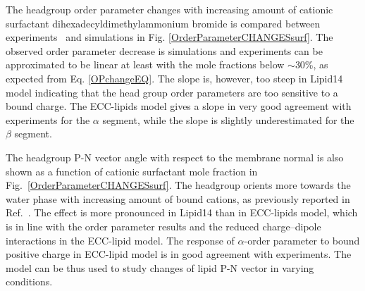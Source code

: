 \documentclass[aip,jcp,twocolumn]{revtex4}
\begin{document}
The headgroup order parameter changes with increasing amount of 
cationic surfactant dihexadecyldimethylammonium bromide 
is compared between experiments~\cite{scherer89} and simulations in
Fig. \ref{OrderParameterCHANGESsurf}. 
The observed order parameter decrease is simulations and experiments
can be approximated to be linear at least with the mole fractions
below $\sim$30\%, as expected from Eq. \ref{OPchangeEQ}.
The slope is, however, too steep in Lipid14 model indicating that 
the head group order parameters are too sensitive to a bound charge.
The ECC-lipids model gives a slope in very good agreement with experiments
for the $\alpha$ segment, while the slope is slightly
underestimated for the $\beta$ segment.

The headgroup P-N vector angle with respect to the membrane normal
is also shown as a function of cationic surfactant mole fraction
in Fig.~\ref{OrderParameterCHANGESsurf}.
The headgroup orients more towards the water phase with increasing
amount of bound cations, as previously reported in Ref.~. 
The effect is more pronounced in Lipid14 than 
in ECC-lipids model, which is in line with the order parameter 
results and the reduced charge--dipole interactions in the ECC-lipid model.
The response of $\alpha$-order parameter to bound positive charge
in ECC-lipid model is in good agreement with experiments.
The model can be thus used to study changes of lipid P-N vector
in varying conditions.

%
%
\end{document}
